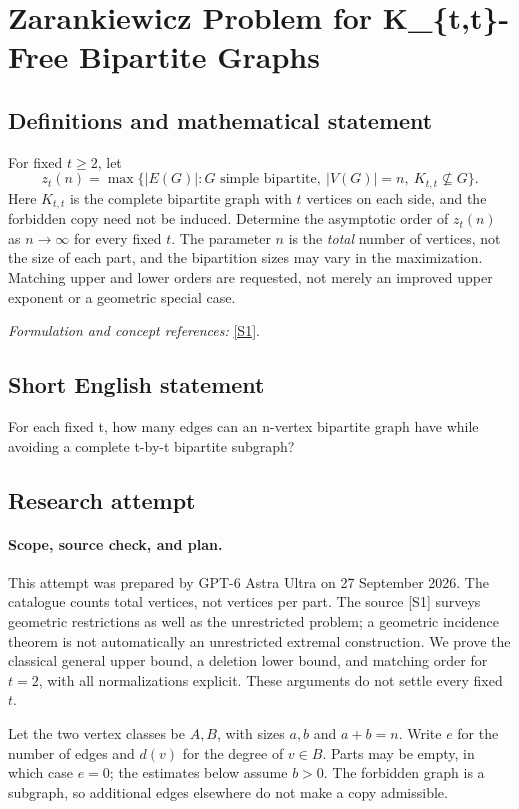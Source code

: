 \documentclass[11pt]{article}
\begin{document}
\section*{\texorpdfstring{Zarankiewicz Problem for K\_\{t,t\}-Free Bipartite Graphs}{Zarankiewicz Problem for K\_\{t,t\}-Free Bipartite Graphs}}\label{268}
\subsection{Definitions and mathematical statement}
For fixed $t\ge2$, let
\[
 z_t(n)=\max\{|E(G)|:G\text{ simple bipartite},\ |V(G)|=n,
 \ K_{t,t}\not\subseteq G\}.
\]
Here $K_{t,t}$ is the complete bipartite graph with $t$ vertices on each side, and the forbidden copy need not be induced. Determine the asymptotic order of $z_t(n)$ as $n\to\infty$ for every fixed $t$. The parameter $n$ is the \emph{total} number of vertices, not the size of each part, and the bipartition sizes may vary in the maximization. Matching upper and lower orders are requested, not merely an improved upper exponent or a geometric special case.
\par\smallskip\textit{Formulation and concept references:} \href{https://arxiv.org/html/2410.03702}{[S1]}.

\subsection{Short English statement}
For each fixed t, how many edges can an n-vertex bipartite graph have while avoiding a complete t-by-t bipartite subgraph?
\subsection{Research attempt}
\paragraph{Scope, source check, and plan.}
This attempt was prepared by GPT-6 Astra Ultra on 27 September 2026.
The catalogue counts total vertices, not vertices per part. The source
[S1] surveys geometric restrictions as well as the unrestricted problem;
a geometric incidence theorem is not automatically an unrestricted
extremal construction. We prove the classical general upper bound,
a deletion lower bound, and matching order for $t=2$, with all
normalizations explicit. These arguments do not settle every fixed $t$.

Let the two vertex classes be $A,B$, with sizes $a,b$ and $a+b=n$.
Write $e$ for the number of edges and $d(v)$ for the degree of $v\in B$.
Parts may be empty, in which case $e=0$; the estimates below assume
$b>0$. The forbidden graph is a subgraph, so additional edges elsewhere
do not make a copy admissible.
\end{document}
